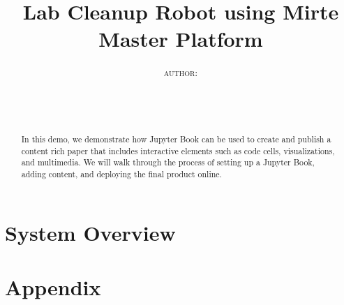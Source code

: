 \documentclass{article}
\title{Lab Cleanup Robot using Mirte Master Platform}
\date{%
  \ThesisExtraInfo\\[1.5em]
  \displaydate{articleDate}\\[1.5em]
}
\author{
\textsc{
author: %
}}
\newcommand{\showPageNumbers}{arabic} %
\begin{document}
\maketitle
\vfill


\vfill

\newpage

\begin{abstract}
In this demo, we demonstrate how Jupyter Book can be used to create and publish a content rich paper that includes
interactive elements such as code cells, visualizations, and multimedia. We will walk through the process of setting
up a Jupyter Book, adding content, and deploying the final product online.
\end{abstract}
\vspace{1.5em}
\clearpage

\setcounter{tocdepth}{2}

  \setcounter{tocdepth}{2}

\clearpage
\tableofcontents
\clearpage

\pagenumbering{\showPageNumbers}






\section{System Overview}













\section{Appendix}








\printglossaries


\clearpage

\end{document}
